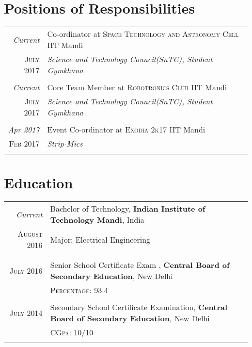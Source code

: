 \documentclass[a4paper,10pt]{article}
\begin{document}
\section{Positions of Responsibilities}
\begin{tabular}{r|p{11cm}}
 \emph{Current} & Co-ordinator at \textsc{Space Technology and Astronomy Cell} IIT Mandi \\\textsc{July 2017}&\emph{Science and Technology Council(SnTC), Student Gymkhana}\\\multicolumn{2}{c}{} \\
  \emph{Current} & Core Team Member at \textsc{Robotronics Club} IIT Mandi \\\textsc{July 2017}&\emph{Science and Technology Council(SnTC), Student Gymkhana}\\\multicolumn{2}{c}{} \\
  \emph{Apr 2017} & Event Co-ordinator at \textsc{Exodia 2k17} IIT Mandi \\\textsc{Feb 2017}&\emph{Strip-Mics}\\\multicolumn{2}{c}{} \\

\end{tabular}

\section{Education}
\begin{tabular}{r | l}	
 \emph{Current} & Bachelor of Technology, \textbf{Indian Institute of Technology Mandi}, India\\
\textsc{August} 2016  &    Major: Electrical Engineering\\
&\normalsize \\\\

\textsc{July} 2016& Senior School Certificate Exam  , \normalsize\textbf{Central Board of Secondary Education}, New Delhi\\
&\normalsize \textsc{Percentage}: 93.4\hyperlink{grds_cleli}{\hfill \footnotesize }\\&\\
\textsc{July} 2014& Secondary School Certificate Examination,  \textbf{Central Board of Secondary Education}, New Delhi\\
&\textsc{CGpa}: 10/10 \hyperlink{grds_usc}{\hfill \footnotesize}\\&\\

\end{tabular}
\end{document}
